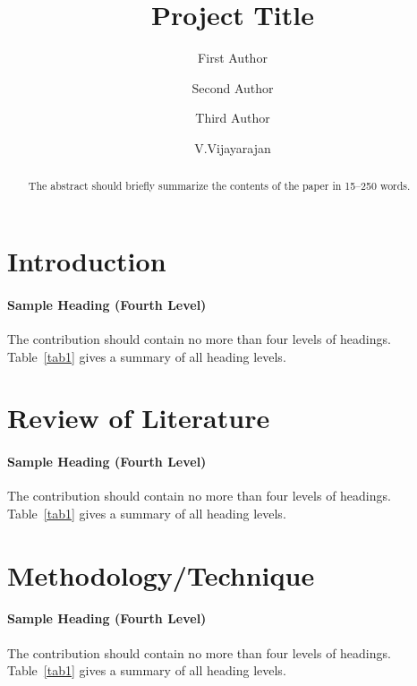 \documentclass[runningheads]{llncs}
\begin{document}
%
\title{Project Title}
%
%
\author{First Author \and
Second Author \and
 Third Author \and
V.Vijayarajan}
%

%
%
\maketitle              %
%
\begin{abstract}
The abstract should briefly summarize the contents of the paper in
15--250 words.

\end{abstract}
%
%
%
\section{Introduction}

\paragraph{Sample Heading (Fourth Level)}
The contribution should contain no more than four levels of
headings. Table~\ref{tab1} gives a summary of all heading levels.

\section{Review of Literature}

\paragraph{Sample Heading (Fourth Level)}
The contribution should contain no more than four levels of
headings. Table~\ref{tab1} gives a summary of all heading levels.

\section{Methodology/Technique}

\paragraph{Sample Heading (Fourth Level)}
The contribution should contain no more than four levels of
headings. Table~\ref{tab1} gives a summary of all heading levels.
\end{document}
